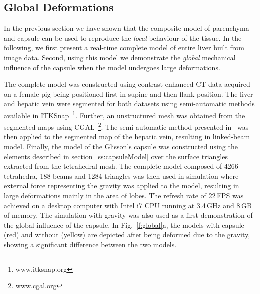 \documentclass[final,3p,times,twocolumn]{elsarticle}
\begin{document}
\subsection{Global Deformations} %

In the previous section we have shown that the composite model of parenchyma and 
capsule can be used to reproduce the \emph{local} behaviour of the tissue. In the following, 
we first present a real-time complete model of entire liver built from image data. 
Second, using this model we demonstrate the \emph{global} mechanical influence of the capsule when 
the model undergoes large deformations. 

The complete model was constructed using contrast-enhanced CT data acquired on a female pig 
being positioned first in supine and then flank position. 
The liver and hepatic vein were segmented for both datasets  using semi-automatic methods available in ITKSnap~\footnote{www.itksnap.org}.
Further, an unstructured mesh was obtained from the segmented maps using CGAL~\footnote{www.cgal.org}. 
The semi-automatic method presented in~\cite{Peterlik2012} was 
then applied to the segmented map of the hepatic vein, resulting in linked-beam model. 
Finally, the model of the Glisson's capsule was constructed using the elements described in 
section~\ref{ss:capsuleModel} over the surface triangles extracted from the tetrahedral mesh. 
The complete model composed of 4266 tetrahedra, 188 beams and 1284 triangles was then 
used in simulation where external force representing the gravity was applied to the model, 
resulting in large deformations mainly in the area of lobes. The refresh rate of 22\,FPS 
was achieved on a desktop computer with Intel i7 CPU running at 3.4\,GHz and 8\,GB of memory. 
The simulation with gravity was also used as a first demonstration of the global influence of the capsule. 
In Fig.~\ref{f:global}a, the models with capsule (red) and without (yellow) are depicted after being 
deformed due to the gravity, showing a significant difference between the two models.  

\end{document}
